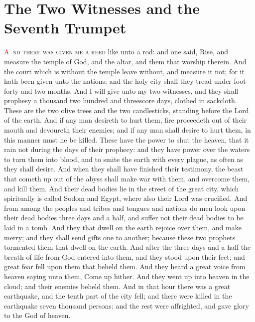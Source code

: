 
\chapter{The Two Witnesses and the Seventh Trumpet}
\lettrine[lines=3,slope=-0.5em]{\textcolor{red}{A}}{\ nd there was given me a reed} like unto a rod: and one said, Rise, and measure the temple of God, and the altar, and them that worship therein. 
 And the court which is without the temple leave without, and measure it not; for it hath been given unto the nations: and the holy city shall they tread under foot forty and two months. 
 And I will give unto my two witnesses, and they shall prophesy a thousand two hundred and threescore days, clothed in sackcloth. 
 These are the two olive trees and the two candlesticks, standing before the Lord of the earth. 
 And if any man desireth to hurt them, fire proceedeth out of their mouth and devoureth their enemies; and if any man shall desire to hurt them, in this manner must he be killed. 
 These have the power to shut the heaven, that it rain not during the days of their prophecy: and they have power over the waters to turn them into blood, and to smite the earth with every plague, as often as they shall desire. 
 And when they shall have finished their testimony, the beast that cometh up out of the abyss shall make war with them, and overcome them, and kill them. 
 And their dead bodies lie in the street of the great city, which spiritually is called Sodom and Egypt, where also their Lord was crucified. 
 And from among the peoples and tribes and tongues and nations do men look upon their dead bodies three days and a half, and suffer not their dead bodies to be laid in a tomb. 
 And they that dwell on the earth rejoice over them, and make merry; and they shall send gifts one to another; because these two prophets tormented them that dwell on the earth. 
 And after the three days and a half the breath of life from God entered into them, and they stood upon their feet; and great fear fell upon them that beheld them. 
 And they heard a great voice from heaven saying unto them, Come up hither. And they went up into heaven in the cloud; and their enemies beheld them. 
 And in that hour there was a great earthquake, and the tenth part of the city fell; and there were killed in the earthquake seven thousand persons: and the rest were affrighted, and gave glory to the God of heaven.

